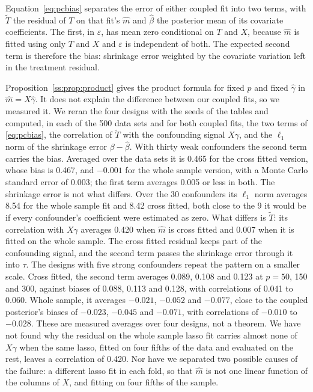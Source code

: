 Equation~\eqref{eq:pcbias} separates the error of either coupled fit into two terms, with $\tilde T$ the residual of $T$ on that fit's $\hat m$ and $\hat\beta$ the posterior mean of its covariate coefficients. The first, in $\varepsilon$, has mean zero conditional on $T$ and $X$, because $\hat m$ is fitted using only $T$ and $X$ and $\varepsilon$ is independent of both. The expected second term is therefore the bias: shrinkage error weighted by the covariate variation left in the treatment residual.

Proposition~\ref{ss:prop:product} gives the product formula for fixed $p$ and fixed $\hat\gamma$ in $\hat m=X\hat\gamma$. It does not explain the difference between our coupled fits, so we measured it. We reran the four designs with the seeds of the tables and computed, in each of the 500 data sets and for both coupled fits, the two terms of \eqref{eq:pcbias}, the correlation of $\tilde T$ with the confounding signal $X\gamma$, and the $\ell_1$ norm of the shrinkage error $\beta - \hat\beta$. With thirty weak confounders the second term carries the bias. Averaged over the data sets it is 0.465 for the cross fitted version, whose bias is 0.467, and $-0.001$ for the whole sample version, with a Monte Carlo standard error of 0.003; the first term averages 0.005 or less in both. The shrinkage error is not what differs. Over the 30 confounders its $\ell_1$ norm averages 8.54 for the whole sample fit and 8.42 cross fitted, both close to the 9 it would be if every confounder's coefficient were estimated as zero. What differs is $\tilde T$: its correlation with $X\gamma$ averages 0.420 when $\hat m$ is cross fitted and 0.007 when it is fitted on the whole sample. The cross fitted residual keeps part of the confounding signal, and the second term passes the shrinkage error through it into $\tau$. The designs with five strong confounders repeat the pattern on a smaller scale. Cross fitted, the second term averages 0.089, 0.108 and 0.123 at $p = 50$, 150 and 300, against biases of 0.088, 0.113 and 0.128, with correlations of 0.041 to 0.060. Whole sample, it averages $-0.021$, $-0.052$ and $-0.077$, close to the coupled posterior's biases of $-0.023$, $-0.045$ and $-0.071$, with correlations of $-0.010$ to $-0.028$. These are measured averages over four designs, not a theorem. We have not found why the residual on the whole sample lasso fit carries almost none of $X\gamma$ when the same lasso, fitted on four fifths of the data and evaluated on the rest, leaves a correlation of 0.420. Nor have we separated two possible causes of the failure: a different lasso fit in each fold, so that $\hat m$ is not one linear function of the columns of $X$, and fitting on four fifths of the sample.

